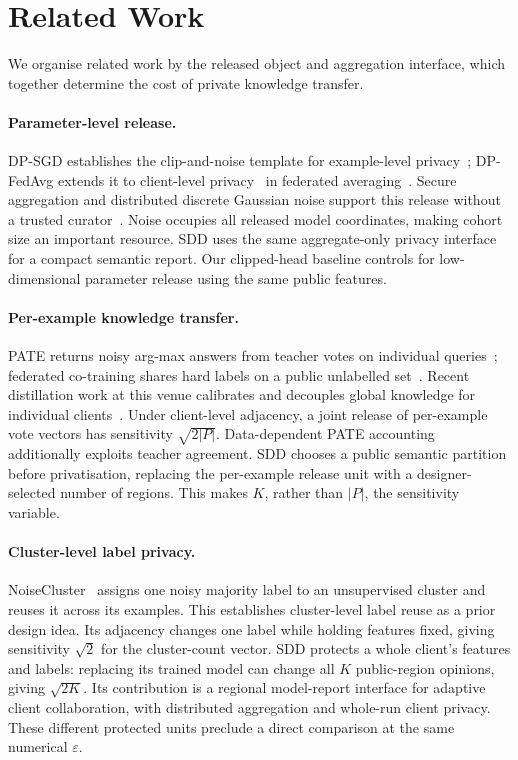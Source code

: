 \section{Related Work}
\label{sec:related}

We organise related work by the released object and aggregation interface,
which together determine the cost of private knowledge transfer.

\paragraph{Parameter-level release.}
DP-SGD establishes the clip-and-noise template for example-level
privacy~\cite{abadi2016deep}; DP-FedAvg extends it to client-level
privacy~\cite{mcmahan2018learning,kairouz2021advances} in federated
averaging~\cite{mcmahan2017communication}. Secure aggregation and distributed
discrete Gaussian noise support this release without a trusted
curator~\cite{bonawitz2017practical,kairouz2021distributed,canonne2020discrete}.
Noise occupies all released model coordinates, making cohort size an important
resource. SDD uses the same aggregate-only privacy interface for a compact
semantic report. Our clipped-head baseline controls for low-dimensional parameter release
using the same public features.

\paragraph{Per-example knowledge transfer.}
PATE returns noisy arg-max answers from teacher votes on individual
queries~\cite{papernot2017semi,papernot2018scalable}; federated co-training
shares hard labels on a public unlabelled set~\cite{abourayya2025little}.
Recent distillation work at this venue calibrates and decouples global knowledge
for individual clients~\cite{wang2026fedakd}. Under client-level adjacency, a
joint release of per-example vote vectors has sensitivity $\sqrt{2|P|}$.
Data-dependent PATE accounting additionally exploits teacher agreement.
SDD chooses a public semantic partition before privatisation, replacing the
per-example release unit with a designer-selected number of regions. This
makes $K$, rather than $|P|$, the sensitivity variable.

\paragraph{Cluster-level label privacy.}
NoiseCluster~\cite{tang2022labels} assigns one noisy majority label to an
unsupervised cluster and reuses it across its examples. This establishes
cluster-level label reuse as a prior design idea. Its adjacency changes one
label while holding features fixed, giving sensitivity $\sqrt{2}$ for the
cluster-count vector. SDD protects a whole client's features and labels:
replacing its trained model can change all $K$ public-region opinions, giving
$\sqrt{2K}$. Its contribution is a regional model-report interface for
adaptive client collaboration, with distributed aggregation and whole-run
client privacy. These different protected units preclude a direct comparison
at the same numerical $\varepsilon$.

